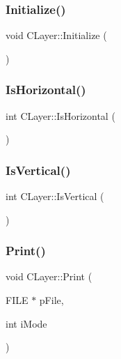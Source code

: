 \mbox{\label{classCLayer_af987bec19614f92ca98bb9e492aecac0}} 
\subsubsection{\texorpdfstring{Initialize()}{Initialize()}}
{\footnotesize\ttfamily void C\+Layer\+::\+Initialize (\begin{DoxyParamCaption}{ }\end{DoxyParamCaption})\hspace{0.3cm}{\ttfamily [virtual]}}

\mbox{\label{classCLayer_a0660beda10939c898dce3991dc2a1194}} 
\subsubsection{\texorpdfstring{IsHorizontal()}{IsHorizontal()}}
{\footnotesize\ttfamily int C\+Layer\+::\+Is\+Horizontal (\begin{DoxyParamCaption}{ }\end{DoxyParamCaption})}

\mbox{\label{classCLayer_a3e1df9f2cdde24028b52418e2c3b09a3}} 
\subsubsection{\texorpdfstring{IsVertical()}{IsVertical()}}
{\footnotesize\ttfamily int C\+Layer\+::\+Is\+Vertical (\begin{DoxyParamCaption}{ }\end{DoxyParamCaption})}

\mbox{\label{classCLayer_a5bba2c50c546b8e5301370f08e963ee6}} 
\subsubsection{\texorpdfstring{Print()}{Print()}}
{\footnotesize\ttfamily void C\+Layer\+::\+Print (\begin{DoxyParamCaption}\item[{F\+I\+LE $\ast$}]{p\+File,  }\item[{int}]{i\+Mode }\end{DoxyParamCaption})\hspace{0.3cm}{\ttfamily [virtual]}}



